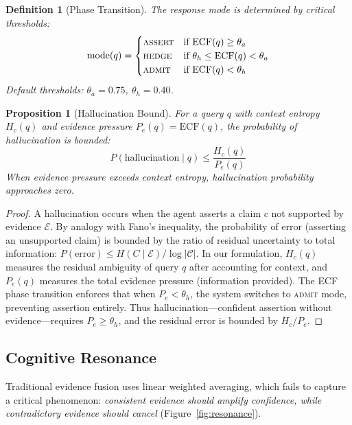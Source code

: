\documentclass[11pt,a4paper]{article}
\newtheorem{proposition}[theorem]{Proposition}
\newtheorem{definition}{Definition}
\begin{document}
\begin{definition}[Phase Transition]
The response mode is determined by critical thresholds:
\begin{equation}
  \text{mode}(q) = \begin{cases}
    \textsc{assert} & \text{if } \text{ECF}(q) \geq \theta_a \\
    \textsc{hedge}  & \text{if } \theta_h \leq \text{ECF}(q) < \theta_a \\
    \textsc{admit}  & \text{if } \text{ECF}(q) < \theta_h
  \end{cases}
\end{equation}
Default thresholds: $\theta_a = 0.75$, $\theta_h = 0.40$.
\end{definition}

\begin{proposition}[Hallucination Bound]
\label{thm:hallucination}
For a query $q$ with context entropy $H_c(q)$ and evidence pressure
$P_e(q) = \text{ECF}(q)$, the probability of hallucination is bounded:
\begin{equation}
  P(\text{hallucination} \mid q) \leq \frac{H_c(q)}{P_e(q)}
\end{equation}
When evidence pressure exceeds context entropy, hallucination probability
approaches zero.
\end{proposition}

\begin{proof}
A hallucination occurs when the agent asserts a claim $c$ not supported
by evidence $\mathcal{E}$. By analogy with Fano's inequality, the
probability of error (asserting an unsupported claim) is bounded by
the ratio of residual uncertainty to total information:
$P(\text{error}) \leq H(C \mid \mathcal{E}) / \log |\mathcal{C}|$.
In our formulation, $H_c(q)$ measures the residual ambiguity of query $q$
after accounting for context, and $P_e(q)$ measures the total evidence
pressure (information provided). The ECF phase transition enforces that
when $P_e < \theta_h$, the system switches to \textsc{admit} mode,
preventing assertion entirely. Thus hallucination---confident assertion
without evidence---requires $P_e \geq \theta_h$, and the residual error
is bounded by $H_c / P_e$.
\end{proof}

\subsection{Cognitive Resonance}

Traditional evidence fusion uses linear weighted averaging, which fails to
capture a critical phenomenon: \emph{consistent evidence should amplify
confidence, while contradictory evidence should cancel}
(Figure~\ref{fig:resonance}).
\end{document}
